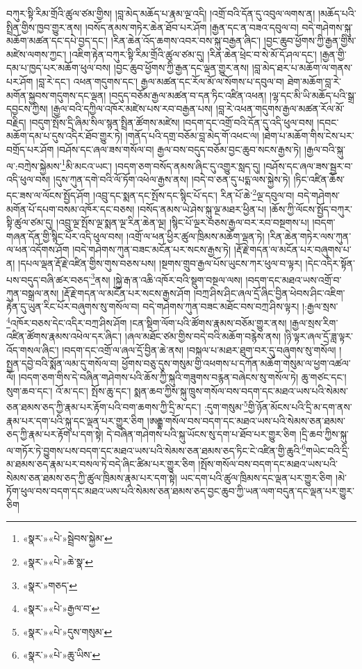 བཀུར་སྟི་རིམ་གྲོའི་ཚུལ་ཙམ་གྱིས། །བླ་མེད་མཆོད་པ་རྣམ་ལྔ་འདི། །འགྲོ་བའི་དོན་དུ་འབུལ་ལགས་ན། །མཆོད་པའི་སྤྲིན་གྱིས་ཁྱབ་གྱུར་ནས། །བསོད་ནམས་གཏེར་ཆེན་ཐོབ་པར་ཤོག །རྒྱན་དང་ན་བཟའ་དབུལ་བ། བདེ་གཤེགས་སྐུ་མཆོག་མཚན་དང་དཔེ་བྱད་དང་། །རིན་ཆེན་འོད་ཆགས་འབར་བས་སྐུ་བརྒྱན་ཞིང་། །བྱང་ཆུབ་ཕྱོགས་ཀྱི་རྒྱན་གྱིས་མཛེས་ལགས་ཀྱང་། །འཇིག་རྟེན་བཀུར་སྟི་རིམ་གྲོའི་ཚུལ་ཙམ་དུ། །རིན་ཆེན་ཕྲེང་བ་སེ་མོ་དོ་ཤལ་དང་། །རྒྱན་གྱི་དམ་པ་ཁྱད་པར་མཆོག་ཕུལ་བས། །བྱང་ཆུབ་ཕྱོགས་ཀྱི་རྒྱན་དང་ལྡན་གྱུར་ནས། །བླ་མེད་ཐར་པ་མཆོག་ལ་གནས་པར་ཤོག །བླ་རེ་དང་། འཕན་གདུགས་དང་། རྒྱལ་མཚན་དང་རོལ་མོ་ལ་སོགས་པ་དབུལ་བ། ཐེག་མཆོག་བླ་རེ་མགོན་སྐྱབས་གདུགས་དང་ལྡན། །བདུད་བཅོམ་རྒྱལ་མཚན་བ་དན་ཏིང་འཛིན་འཕན། །ལྷ་དང་མི་ཡི་མཆོད་པའི་སྒྲ་དབྱངས་ཀྱིས། །རྒྱལ་བའི་དཀྱིལ་འཁོར་མཛེས་པས་རབ་བརྒྱན་པས། །བླ་རེ་འཕན་གདུགས་རྒྱལ་མཚན་རོལ་མོ་བརྗིད། །བདུག་སྤོས་དྲི་ཞིམ་སིལ་སྙན་སྤྲིན་ཚོགས་མཛེས། །བདག་དང་འགྲོ་བའི་དོན་དུ་འདི་ཕུལ་བས། །དབང་མཆོག་དམ་པ་དུས་འདིར་ཐོབ་གྱུར་ཏེ། །གནོད་པའི་དགྲ་བཅོམ་བླ་མེད་གོ་འཕང་ལ། །ཐེག་པ་མཆོག་གིས་ངེས་པར་བགྲོད་པར་ཤོག །བཤོས་དང་ཞལ་ཟས་གསོལ་བ། རྒྱལ་བས་བདུད་བཅོམ་བྱང་ཆུབ་སངས་རྒྱས་ཏེ། །རྒྱལ་བའི་སྐུ་ལ་:བཀྲེས་སྐྱེམས་\footnote{«སྣར་»«པེ་»སྦྲེབས་སྐྱེམ་}མི་མངའ་ཡང་། །བདག་ཅག་བསོད་ནམས་ཞིང་དུ་འགྱུར་སླད་དུ། །བཤོས་དང་ཞལ་ཟས་སྦྱར་བ་འདི་ཕུལ་བས། །དུས་ཀུན་དགེ་བའི་ལོ་ཏོག་འཕེལ་རྒྱས་ནས། །བདེ་བ་ཅན་དུ་པདྨ་ལས་སྐྱེས་ཏེ། །ཏིང་འཛིན་ཆོས་དང་ཟས་ལ་ལོངས་སྤྱོད་ཤོག །འབྲུ་དང་སྨན་དང་སྤོས་དང་སྙིང་པོ་དང་། རིན་པོ་ཆེ་\footnote{«སྣར་»«པེ་»ཆེ་སྣ་}ལྔ་དབུལ་བ། བདེ་གཤེགས་མགོན་པོ་དཔག་བསམ་འཁོར་དང་བཅས། །བསོད་ནམས་ཡེ་ཤེས་སྐུ་ལྔ་མཐར་ཕྱིན་པ། །ཆོས་ཀྱི་ལོངས་སྤྱོད་བཀུར་སྟི་ཚུལ་ཙམ་དུ། །འབྲུ་ལྔ་སྤོས་ལྔ་སྨན་ལྔ་རིན་ཆེན་ལྔ། །སྙིང་པོ་ལྔར་བཅས་རྒྱལ་བར་རབ་བསྔགས་པ། །བདག་གཞན་དོན་གྱི་སྙིང་པོར་འདི་ཕུལ་བས། །འགྲོ་ལ་ཕན་ཕྱིར་ཚུལ་ཁྲིམས་མཆོག་ལྡན་ཏེ། །རིན་ཆེན་གཏེར་ལས་ཀུན་ལ་ཕན་འདོགས་ཤོག །བདེ་གཤེགས་ཀུན་བཟང་མངོན་པར་སངས་རྒྱས་ཏེ། །རྡོ་རྗེ་གདན་ལ་མངོན་པར་བཞུགས་པ་ན། །དཔལ་ལྡན་རྡོ་རྗེ་འཛིན་གྱིས་གུས་བཅས་པས། །སྔགས་གྲུབ་རྒྱལ་པོས་ཡུངས་ཀར་ཕུལ་བ་ལྟར། །དེང་འདིར་སྟོན་པས་བདུད་བཞི་ཚར་བཅད་\footnote{«སྣར་»གཅད་}ནས། །སྐྱེ་རྒ་ན་འཆི་འཁོར་བའི་སྡུག་བསྔལ་ལས། །བདག་དང་མཐའ་ཡས་འགྲོ་བ་ཀུན་བསྒྲལ་ནས། །རྡོ་རྗེ་གདན་ལ་མངོན་པར་སངས་རྒྱས་ཤོག །བཀྲ་ཤིས་ཤིང་ཞལ་དྲོ་ཞིང་བྱིན་ཕེབས་ཤིང་འཇིག་རྟེན་དུ་ཡུན་རིང་པོར་བཞུགས་སུ་གསོལ་བ། བདེ་གཤེགས་ཀུན་བཟང་མཐོང་བས་བཀྲ་ཤིས་ལྟར། །:རྒྱལ་སྲས་\footnote{«སྣར་»«པེ་»རྒྱལ་བ་}འཁོར་བཅས་དེང་འདིར་བཀྲ་ཤིས་ཤོག །ངན་སྡིག་ལོག་པའི་ཚོགས་རྣམས་བཅོམ་གྱུར་ནས། །རྒྱལ་སྲས་རིག་འཛིན་ཚོགས་རྣམས་འཕེལ་དར་ཞིང་། །ཞལ་མཐོང་ཙམ་གྱིས་བདེ་བའི་མཆོག་བརྙེས་ནས། །ཉི་ལྟར་ཞལ་དྲོ་ཟླ་ལྟར་འོད་གསལ་ཞིང་། །བདག་དང་འགྲོ་ལ་ཞལ་དྲོ་བྱིན་ཆེ་ནས། །བསྐལ་པ་མཐར་ཐུག་བར་དུ་བཞུགས་སུ་གསོལ། །སྤྱན་དབྱེ་བའི་སྨོན་ལམ་དུ་གསོལ་བ། ཕྱོགས་བཅུ་དུས་གསུམ་གྱི་འཕགས་པ་དཀོན་མཆོག་གསུམ་ལ་ཕྱག་འཚལ་ལོ། །བདག་ཅག་གིས་དེ་བཞིན་གཤེགས་པའི་ཆོས་ཀྱི་སྐུའི་གཟུགས་བརྙན་བཞེངས་སུ་གསོལ་ཏེ། ཆུ་གཙང་དང་། སུག་ཆབ་དང་། འོ་མ་དང་། སྤོས་ཆུ་དང་། སྨན་ཆབ་ཀྱིས་སྐུ་ཁྲུས་གསོལ་བས་བདག་དང་མཐའ་ཡས་པའི་སེམས་ཅན་ཐམས་ཅད་ཀྱི་རྣམ་པར་རྟོག་པའི་བག་ཆགས་ཀྱི་དྲི་མ་དང་། :དུག་གསུམ་\footnote{«སྣར་»«པེ་»དུས་གསུམ་}གྱི་ཉོན་མོངས་པའི་དྲི་མ་དག་ནས་རྣམ་པར་དག་པའི་སྐུ་དང་ལྡན་པར་གྱུར་ཅིག །ཨརྒྷ་གསོལ་བས་བདག་དང་མཐའ་ཡས་པའི་སེམས་ཅན་ཐམས་ཅད་ཀྱི་རྣམ་པར་རྟོག་པ་དག་སྟེ། དེ་བཞིན་གཤེགས་པའི་སྐུ་ཡོངས་སུ་དག་པ་ཐོབ་པར་གྱུར་ཅིག །དྲི་ཆབ་ཀྱིས་སྐུ་ལ་གཏོར་ཏེ་བྱུགས་པས་བདག་དང་མཐའ་ཡས་པའི་སེམས་ཅན་ཐམས་ཅད་ཏིང་ངེ་འཛིན་གྱི་ཆུའི་\footnote{«སྣར་»«པེ་»ཆུ་ཡིས་}གཡེང་བའི་དྲི་མ་ཐམས་ཅད་རྣམ་པར་བསལ་ཏེ་བདེ་ཞིང་ཚིམ་པར་གྱུར་ཅིག །སྤོས་གསོལ་བས་བདག་དང་མཐའ་ཡས་པའི་སེམས་ཅན་ཐམས་ཅད་ཀྱི་ཚུལ་ཁྲིམས་རྣམ་པར་དག་སྟེ། ཡང་དག་པའི་ཚུལ་ཁྲིམས་དང་ལྡན་པར་གྱུར་ཅིག །མེ་ཏོག་ཕུལ་བས་བདག་དང་མཐའ་ཡས་པའི་སེམས་ཅན་ཐམས་ཅད་བྱང་ཆུབ་ཀྱི་ཡན་ལག་བདུན་དང་ལྡན་པར་གྱུར་ཅིག 